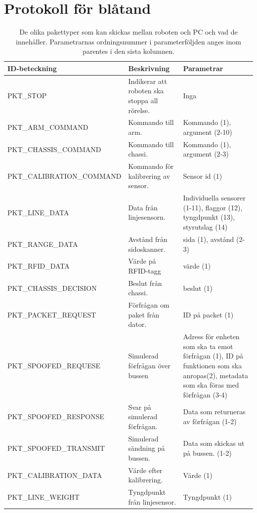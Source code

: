 \section{Protokoll för blåtand}
\begin{table}[H]
\label{packets}
\begin{tabularx}{\textwidth}{|l|X|X|}
\hline
\textbf{ID-beteckning} & \textbf{Beskrivning} & \textbf{Parametrar} \\ \hline
PKT\_STOP & Indikerar att roboten ska stoppa all rörelse. & Inga \\ \hline
PKT\_ARM\_COMMAND & Kommando till arm. & Kommando (1), argument (2-10) \\ \hline
PKT\_CHASSIS\_COMMAND & Kommando till chassi. & Kommando (1), argument (2-3) \\ \hline
PKT\_CALIBRATION\_COMMAND & Kommando för kalibrering av sensor. & Sensor id (1) \\ \hline
PKT\_LINE\_DATA & Data från linjesensorn. & Individuella sensorer (1-11), flaggor (12), tyngdpunkt (13), styrutslag (14) \\ \hline
PKT\_RANGE\_DATA & Avstånd från sidoskanner. & sida (1), avstånd (2-3) \\ \hline
PKT\_RFID\_DATA & Värde på RFID-tagg & värde (1) \\ \hline
PKT\_CHASSIS\_DECISION & Beslut från chassi. & beslut (1) \\ \hline
PKT\_PACKET\_REQUEST & Förfrågan om paket från dator. & ID på packet (1) \\ \hline
PKT\_SPOOFED\_REQUESE & Simulerad förfrågan över bussen & Adress för enheten som ska ta emot förfrågan (1), ID på funktionen som ska anropas(2), metadata som ska föras med förfrågan (3-4) \\ \hline
PKT\_SPOOFED\_RESPONSE & Svar på simulerad förfrågan. & Data som returneras av förfrågan (1-2) \\ \hline
PKT\_SPOOFED\_TRANSMIT & Simulerad sändning på bussen. & Data som skickas ut på bussen. (1-2) \\ \hline
PKT\_CALIBRATION\_DATA & Värde efter kalibrering. & Värde (1) \\ \hline
PKT\_LINE\_WEIGHT & Tyngdpunkt från linjesensor. & Tyngdpunkt (1) \\ \hline
\end{tabularx}
\caption{De olika pakettyper som kan skickas mellan roboten och PC och vad de innehåller. Parametrarnas ordningsnummer i parameterföljden anges inom parentes i den sista kolumnen.}
\end{table}


